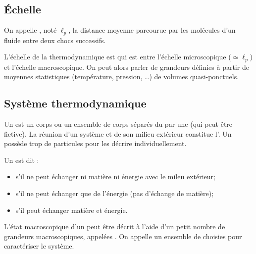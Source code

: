 \subsection{Échelle}

\begin{definition}
On appelle , noté $\ell_p$, la distance moyenne parcourue par les molécules d'un fluide entre deux chocs successifs.
\end{definition}

\begin{remarque}
L'échelle de la thermodynamique est  qui est entre l'échelle microscopique ($\simeq \ell_p$) et l'échelle macroscopique. On peut alors parler de grandeurs définies à partir de moyennes statistiques (température, pression, \ldots) de volumes quasi-ponctuels.
\end{remarque}



\subsection{Système thermodynamique}

\begin{definition}
Un  est un corps ou un ensemble de corps séparés du  par une  (qui peut être fictive). La réunion d'un système et de son milieu extérieur constitue l'. Un  possède trop de particules pour les décrire individuellement.
\end{definition}

\begin{definitions}
Un  est dit :
\begin{itemize}
\item {} s'il ne peut échanger ni matière ni énergie avec le mileu extérieur;
\item {} s'il ne peut échanger que de l'énergie (pas d'échange de matière);
\item {} s'il peut échanger matière et énergie.
\end{itemize}
\end{definitions}

\begin{propriete}[admis]
L'état macroscopique d'un  peut être décrit à l'aide d'un petit nombre de grandeurs macroscopiques, appelées . On appelle  un ensemble de  choisies pour caractériser le système.
\end{propriete}

